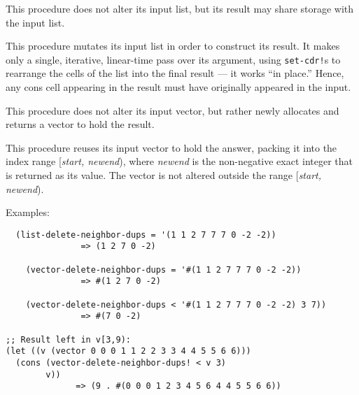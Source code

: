 \begin{entry}{%
  }

  This procedure does not alter its input list, but its result may
  share storage with the input list.
\end{entry}

\begin{entry}{%
  }

  This procedure mutates its input list in order to construct its
  result.  It makes only a single, iterative, linear-time pass over
  its argument, using \texttt{set-cdr!}s to rearrange the cells of the
  list into the final result --- it works ``in place.'' Hence, any
  cons cell appearing in the result must have originally appeared in
  the input.
\end{entry}

\begin{entry}{%
  }

  This procedure does not alter its input vector, but rather newly
  allocates and returns a vector to hold the result.
\end{entry}


\begin{entry}{%
  }

  This procedure reuses its input vector to hold the answer, packing
  it into the index range {[}\emph{start, newend}), where
  \emph{newend} is the non-negative exact integer that is returned as
  its value. The vector is not altered outside the range
  {[}\emph{start, newend}).
\end{entry}
Examples:

\begin{verbatim}
  (list-delete-neighbor-dups = '(1 1 2 7 7 7 0 -2 -2))
               => (1 2 7 0 -2)

    (vector-delete-neighbor-dups = '#(1 1 2 7 7 7 0 -2 -2))
               => #(1 2 7 0 -2)

    (vector-delete-neighbor-dups < '#(1 1 2 7 7 7 0 -2 -2) 3 7))
               => #(7 0 -2)

;; Result left in v[3,9):
(let ((v (vector 0 0 0 1 1 2 2 3 3 4 4 5 5 6 6)))
  (cons (vector-delete-neighbor-dups! < v 3)
        v))
              => (9 . #(0 0 0 1 2 3 4 5 6 4 4 5 5 6 6))
\end{verbatim}

